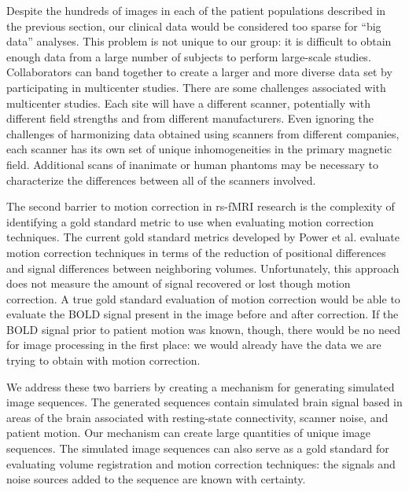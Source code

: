 Despite the hundreds of images in each of the patient populations described in the previous section, our clinical data would be considered too sparse for ``big data'' analyses. This problem is not unique to our group: it is difficult to obtain enough data from a large number of subjects to perform large-scale studies. Collaborators can band together to create a larger and more diverse data set by participating in multicenter studies. There are some challenges associated with multicenter studies. Each site will have a different scanner, potentially with different field strengths and from different manufacturers. Even ignoring the challenges of harmonizing data obtained using scanners from different companies, each scanner has its own set of unique inhomogeneities in the primary magnetic field. Additional scans of inanimate or human phantoms may be necessary to characterize the differences between all of the scanners involved.

The second barrier to motion correction in rs-fMRI research is the complexity of identifying a gold standard metric to use when evaluating motion correction techniques. The current gold standard metrics developed by Power et al. evaluate motion correction techniques in terms of the reduction of positional differences and signal differences between neighboring volumes. Unfortunately, this approach does not measure the amount of signal recovered or lost though motion correction. A true gold standard evaluation of motion correction would be able to evaluate the BOLD signal present in the image before and after correction. If the BOLD signal prior to patient motion was known, though, there would be no need for image processing in the first place: we would already have the data we are trying to obtain with motion correction.

We address these two barriers by creating a mechanism for generating simulated image sequences. The generated sequences contain simulated brain signal based in areas of the brain associated with resting-state connectivity, scanner noise, and patient motion. Our mechanism can create large quantities of unique image sequences. The simulated image sequences can also serve as a gold standard for evaluating volume registration and motion correction techniques: the signals and noise sources added to the sequence are known with certainty.


